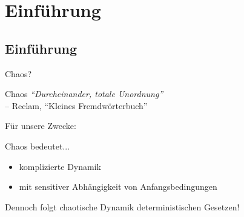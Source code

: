 \section{Einführung}

\subsection{Einführung}

\begin{frame}{Chaos?}

  \begin{alertbbox}{Chaos}
    \emph{``Durcheinander, totale Unordnung''}\\[0.5ex]
    \scriptsize{\hspace{0.5ex} -- Reclam, ``Kleines Fremdwörterbuch''}
  \end{alertbbox}

  \pause

  Für unsere Zwecke:

  \begin{bbox}{Chaos bedeutet...}
    \begin{itemize}
    \item komplizierte Dynamik
    \item mit sensitiver Abhängigkeit von Anfangsbedingungen
    \end{itemize}
  \end{bbox}

  \pause

  Dennoch folgt chaotische Dynamik \alert{deterministischen} Gesetzen!
\end{frame}



